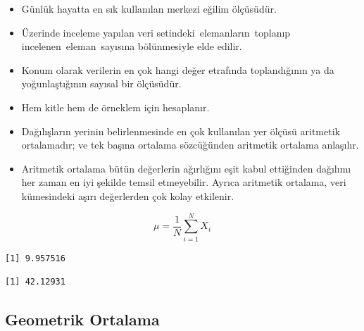 \documentclass[
  letterpaper,
  DIV=11,
  numbers=noendperiod]{scrreprt}
\newenvironment{Shaded}{\begin{snugshade}}{\end{snugshade}}
\newcommand{\AttributeTok}[1]{\textcolor[rgb]{0.40,0.45,0.13}{#1}}
\newcommand{\CommentTok}[1]{\textcolor[rgb]{0.37,0.37,0.37}{#1}}
\newcommand{\ConstantTok}[1]{\textcolor[rgb]{0.56,0.35,0.01}{#1}}
\newcommand{\FunctionTok}[1]{\textcolor[rgb]{0.28,0.35,0.67}{#1}}
\newcommand{\NormalTok}[1]{\textcolor[rgb]{0.00,0.23,0.31}{#1}}
\newcommand{\SpecialCharTok}[1]{\textcolor[rgb]{0.37,0.37,0.37}{#1}}
\begin{document}
\begin{itemize}
\item
  Günlük hayatta en sık kullanılan merkezi eğilim ölçüsüdür.
\item
  Üzerinde inceleme yapılan veri setindeki~elemanların~toplanıp
  incelenen~eleman~sayısına bölünmesiyle elde edilir.
\item
  Konum olarak verilerin en çok hangi değer etrafında toplandığının ya
  da yoğunlaştığının sayısal bir ölçüsüdür.
\item
  Hem kitle hem de örneklem için hesaplanır.
\item
  Dağılışların yerinin belirlenmesinde en çok kullanılan yer ölçüsü
  aritmetik ortalamadır; ve tek başına ortalama sözcüğünden aritmetik
  ortalama anlaşılır.
\item
  Aritmetik ortalama bütün değerlerin ağırlığını eşit kabul ettiğinden
  dağılımı her zaman en iyi şekilde temsil etmeyebilir. Ayrıca aritmetik
  ortalama, veri kümesindeki aşırı değerlerden çok kolay etkilenir.
\end{itemize}

\[ \mu = \frac{1}{N}\sum_{i=1}^NX_i \]

\begin{Shaded}
\end{Shaded}

\begin{verbatim}
[1] 9.957516
\end{verbatim}

\begin{Shaded}
\end{Shaded}

\begin{verbatim}
[1] 42.12931
\end{verbatim}

\subsection*{Geometrik Ortalama}\label{geometrik-ortalama}
\end{document}

